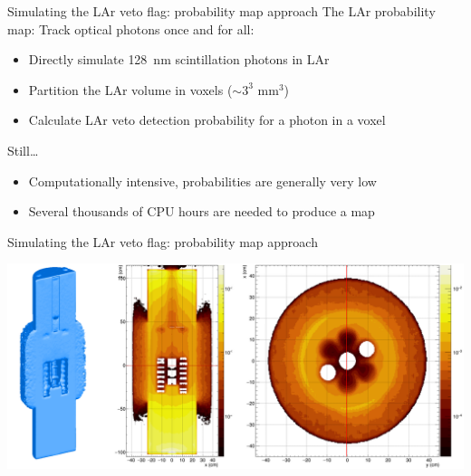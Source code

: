 \documentclass[10pt,aspectratio=169]{beamer}
\begin{document}
\begin{frame}{Simulating the LAr veto flag: probability map approach}
  The LAr probability map: Track optical photons once and for all:
  \begin{itemize}
    \item Directly simulate \alert{128~nm} scintillation photons in LAr
    \item Partition the LAr volume in \alert{voxels} ($\sim3^3$ mm$^3$)
    \item Calculate LAr veto \alert{detection probability} for a photon in a voxel
  \end{itemize}
  Still\ldots
  \begin{itemize}
    \item Computationally intensive, probabilities are generally very low
    \item Several thousands of CPU hours are needed to produce a map
  \end{itemize}
\end{frame}
\begin{frame}{Simulating the LAr veto flag: probability map approach}
  \begin{center}
    \includegraphics[width=\textwidth]{plots/bkg/lar/ph2/larmodel/larmap-tac.png}
  \end{center}
\end{frame}
\end{document}
